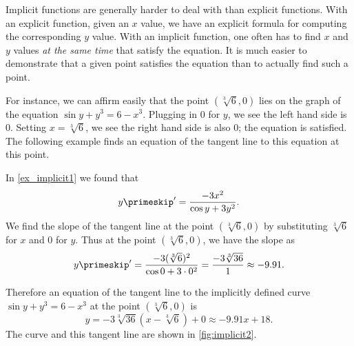 Implicit functions are generally harder to deal with than explicit functions. With an explicit function, given an $x$ value, we have an explicit formula for computing the corresponding $y$ value. With an implicit function, one often has to find $x$ and $y$ values \textit{at the same time} that satisfy the equation. It is much easier to demonstrate that a given point satisfies the equation than to actually find such a point.

For instance, we can affirm easily that the point $(\sqrt[3]{6},0)$ lies on the graph of the equation $\sin y + y^3=6-x^3$. Plugging in $0$ for $y$, we see the left hand side is $0$. Setting $x=\sqrt[3]6$, we see the right hand side is also $0$; the equation is satisfied. The following example finds an equation of the tangent line to this equation at this point.

%
{In \autoref{ex_implicit1} we found that
\[y\primeskip' = \frac{-3x^2}{\cos y +3y^2}.\]
We find the slope of the tangent line at the point  $(\sqrt[3]6,0)$ by substituting $\sqrt[3]6$ for $x$ and $0$ for $y$. Thus at the point $(\sqrt[3]6,0)$, we have the slope as
\[y\primeskip' = \frac{-3(\sqrt[3]{6})^2}{\cos 0 + 3\cdot0^2} = \frac{-3\sqrt[3]{36}}{1} \approx -9.91.\]

Therefore an equation of the tangent line to the implicitly defined curve $\sin y + y^3=6-x^3$ at the point $(\sqrt[3]{6},0)$ is
\[y = -3\sqrt[3]{36}(x-\sqrt[3]{6})+0 \approx -9.91x+18.\]
The curve and this tangent line are shown in \autoref{fig:implicit2}.}



